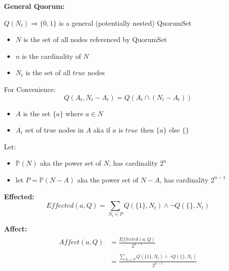 \documentclass[10pt]{article}
\begin{document}
\newcommand{\powerset}[1]{\mathbb{P}(#1)}

\newcommand{\effectedExpression}[0]{ \sum_{N_t \in P} Q(\{1\},N_t) \land \lnot Q(\{\},N_t) }
\newcommand{\affectDenomExpression}[0]{ 2^{n-1} }
\newcommand{\requireDenomExpression}[0]{ \sum_{N_t \in P} Q(\{a\},N_t) }
\newcommand{\influenceDenomExpression}[0]{ \sum_{N_t \in P} \lnot Q(\{\},N_t) }


\textbf{General Quorum:}\\\par
$Q(N_t) \Rightarrow \{0,1\}$ is a general (potentially nested) QuorumSet

\begin{itemize}
  \item $N$ is the set of all nodes referenced by QuorumSet
  \item $n$ is the cardinality of $N$
  \item $N_t$ is the set of all $true$ nodes
\end{itemize}

For Convenience:
\begin{equation}
    Q(A_t,N_t-A_t) = Q(A_t \cap (N_t-A_t))
\end{equation}
\begin{itemize}
  \item $A$ is the set $\{a\}$ where $a \in N$
  \item $A_t$ set of true nodes in $A$ aka if $a$ is $true$ then $\{a\}$ else $\{\}$
\end{itemize}

Let:
\begin{itemize}
  \item $\powerset{N}$ aka the power set of $N$, has cardinality $2^n$
  \item let $P = \powerset{N-A}$ aka the power set of $N-A$, has cardinality $2^{n-1}$
\end{itemize}





\leavevmode
\par
\textbf{Effected:}
\begin{equation}
    Effected(a,Q) = \effectedExpression{}
\end{equation}

\textbf{Affect:}
\begin{align}
\begin{split}
    Affect(a,Q) &= \frac{Effected(a,Q)}{\affectDenomExpression{}} \\
\\
                &= \frac{\effectedExpression{}}{\affectDenomExpression{}}
\end{split}
\end{align}
\end{document}
